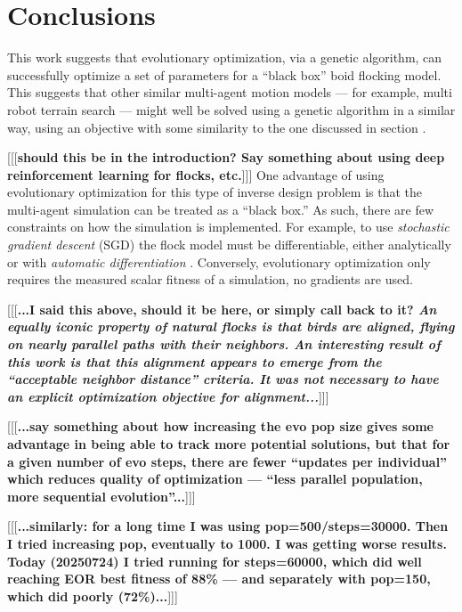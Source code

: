 \documentclass[letterpaper]{article}
\begin{document}

\section{Conclusions}
\label{sec:Conclusions}

This work suggests that evolutionary optimization, via a genetic algorithm, can successfully optimize a set of parameters for a ``black box'' boid flocking model. This suggests that other similar multi-agent motion models --- for example, multi robot terrain search --- might well be solved using a genetic algorithm in a similar way, using an objective with some similarity to the one discussed in section .

[[[\textbf{should this be in the introduction? Say something about using deep reinforcement learning for flocks, etc.}]]] One advantage of using evolutionary optimization for this type of inverse design problem is that the multi-agent simulation can be treated as a ``black box.'' As such, there are few constraints on how the simulation is implemented. For example, to use \textit{stochastic gradient descent} (SGD) \citep{robbins_stochastic_1951} the flock model must be differentiable, either analytically or with \textit{automatic differentiation} \citep{baydin_automatic_2018}. Conversely, evolutionary optimization only requires the measured scalar fitness of a simulation, no gradients are used.

[[[\textbf{...I said this above, should it be here, or simply call back to it? \textit{An equally iconic property of natural flocks is that birds are aligned, flying on nearly parallel paths with their neighbors. An interesting result of this work is that this alignment appears to \textit{emerge} from the ``acceptable neighbor distance'' criteria. It was \textbf{not} necessary to have an explicit optimization objective for alignment...}}]]]

[[[\textbf{...say something about how increasing the evo pop size gives some advantage in being able to track more potential solutions, but that for a given number of evo steps, there are fewer ``updates per individual'' which reduces quality of optimization --- ``less parallel population, more sequential evolution''...}]]]

[[[\textbf{...similarly: for a long time I was using pop=500/steps=30000. Then I tried increasing pop, eventually to 1000. I was getting worse results. Today (20250724) I tried running for steps=60000, which did well reaching EOR best fitness of 88\% --- and separately with pop=150, which did poorly (72\%)...}]]]
\end{document}

